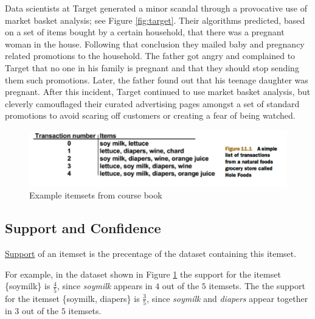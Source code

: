 \documentclass[a4paper]{article}
\begin{document}
Data scientists at Target generated a minor scandal through a provocative use of market basket analysis; see Figure \ref{fig:target}.  Their algorithms predicted, based on a set of items bought by a certain household, that there was a pregnant woman in the house. Following that conclusion they mailed baby and pregnancy related promotions to the household. The father got angry and complained to Target that no one in his family is pregnant and that they should stop sending them such promotions. Later, the father found out that his teenage daughter was pregnant. After this incident, Target continued to use market basket analysis, but cleverly camouflaged their curated advertising pages amongst a set of standard promotions to avoid scaring off customers or creating a fear of being watched.

\begin{figure}
\centering
\includegraphics[width=1.0\textwidth]{ItemsetExamples.png}
\caption{\label{fig:itemsets} Example itemsets from course book}
\end{figure}

\subsection{Support and Confidence}

\newenvironment{definition}[1][Definition]{\begin{trivlist}
\item[\hskip \labelsep {\bfseries #1}]}{\end{trivlist}}

\begin{definition}
\underline{Support} of an itemset is the precentage of the dataset containing this itemset.
\end{definition}

For example, in the dataset shown in Figure \ref{fig:itemsets} the support for the itemset \{soymilk\} is $\frac{4}{5}$, since \textit{soymilk} appears in $4$ out of the $5$ itemsets. The the support for the itemset \{soymilk, diapers\} is $\frac{3}{5}$, since \textit{soymilk} and \textit{diapers} appear together in $3$ out of the $5$ itemsets.
\end{document}
